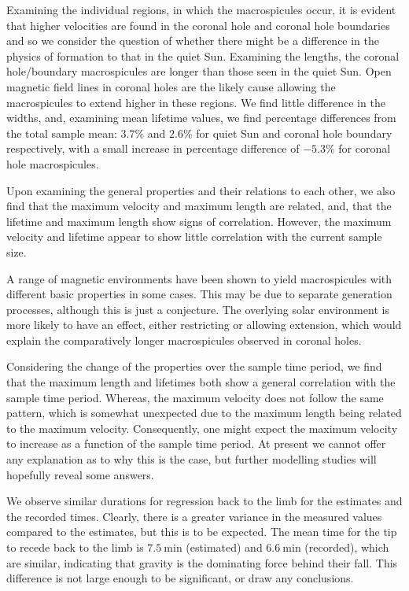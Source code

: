 Examining the individual regions, in which the macrospicules occur, it is evident that higher velocities are found in the coronal hole and coronal hole boundaries and so we consider the question of whether there might be a difference in the physics of formation to that in the quiet Sun. Examining the lengths, the coronal hole/boundary macrospicules are longer than those seen in the quiet Sun. Open magnetic field lines in coronal holes are the likely cause allowing the macrospicules to extend higher in these regions. We find little difference in the widths, and, examining mean lifetime values, we find percentage differences from the total sample mean: $3.7\%$ and $2.6\%$ for quiet Sun and coronal hole boundary respectively, with a small increase in percentage difference of $-5.3\%$ for coronal hole macrospicules.

Upon examining the general properties and their relations to each other, we also find that the maximum velocity and maximum length are related, and, that the lifetime and maximum length show signs of correlation. However, the maximum velocity and lifetime appear to show little correlation with the current sample size.

A range of magnetic environments have been shown to yield macrospicules with different basic properties in some cases. This may be due to separate generation processes, although this is just a conjecture. The overlying solar environment is more likely to have an effect, either restricting or allowing extension, which would explain the comparatively longer macrospicules observed in coronal holes.

Considering the change of the properties over the sample time period, we find that the maximum length and lifetimes both show a general correlation with the sample time period. Whereas, the maximum velocity does not follow the same pattern, which is somewhat unexpected due to the maximum length being related to the maximum velocity. Consequently, one might expect the maximum velocity to increase as a function of the sample time period. At present we cannot offer any explanation as to why this is the case, but further modelling studies will hopefully reveal some answers.

We observe similar durations for regression back to the limb for the estimates and the recorded times. Clearly, there is a greater variance in the measured values compared to the estimates, but this is to be expected. The mean time for the tip to recede back to the limb is $7.5\ \textrm{min}$ (estimated) and $6.6\ \textrm{min}$ (recorded), which are similar, indicating that gravity is the dominating force behind their fall. This difference is not large enough to be significant, or draw any conclusions.

